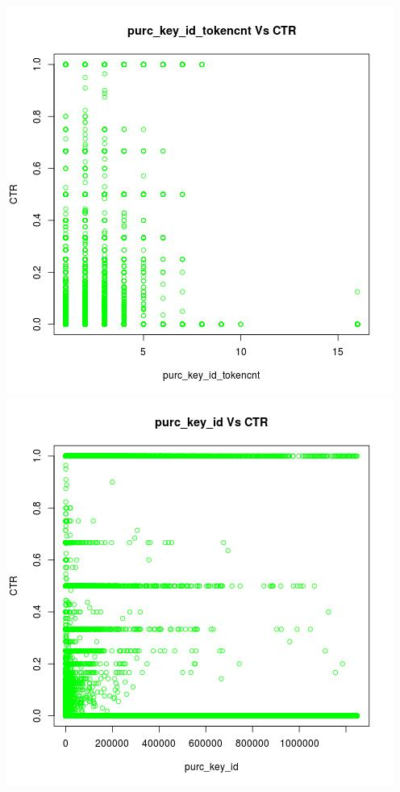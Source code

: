 \documentclass[10pt]{article}
\begin{document}
\includegraphics[scale=0.5]{purc_key_id_tokencnt_Vs_CTR}
\includegraphics[scale=0.5]{purc_key_id_Vs_CTR}\\\\
\end{document}
